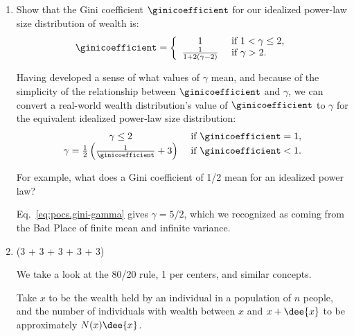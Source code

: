 \begin{enumerate}
  
   \solutionstart


   \solutionend


\item

  Show that the Gini coefficient $\ginicoefficient$
  for our idealized power-law size distribution of wealth is:
  \begin{equation}
    \ginicoefficient 
    =
    \left\{
    \begin{array}{cl}
      1
      &
      \ \textnormal{if} \
      1 < \gamma \le 2,
      \\
      \frac{1}{1 + 2(\gamma-2)}
      &
      \ \textnormal{if} \
      \gamma > 2.
    \end{array}
    \right.
    \label{eq:pocs.gini}
  \end{equation}

  Having developed a sense of what values of $\gamma$ mean,
  and because of the simplicity of the relationship between
  $\ginicoefficient$
  and
  $\gamma$,
  we can convert a real-world wealth distribution's
  value of $\ginicoefficient$
  to $\gamma$ for
  the equivalent
  idealized power-law size distribution:
  \begin{equation}
    \begin{array}{cl}
      \gamma
      \le
      2
      &
      \ \textnormal{if} \
      \ginicoefficient = 1,
      \\
      \gamma
      =
      \frac{1}{2}
      \left(
      \frac{1}{\ginicoefficient}
      +
      3
      \right)
      &
      \ \textnormal{if} \
      \ginicoefficient < 1.
    \end{array}
    \label{eq:pocs.gini-gamma}
  \end{equation}

  For example, what does a Gini coefficient of 1/2 mean for an idealized power law?

  Eq.~\ref{eq:pocs.gini-gamma} gives $\gamma = 5/2$,
  which we recognized as coming from the Bad Place of
  finite mean and infinite variance.
  
  
   \solutionstart


   \solutionend


\item (3 + 3 + 3 + 3 + 3)

  We take a look at the 80/20 rule, 1 per centers, and similar concepts.

  Take $x$ to be the  wealth held by an individual 
  in a population of $n$ people,
  and the number of individuals with wealth between $x$ and $x+\dee{x}$
  to be approximately $N(x) \dee{x}$.


\end{enumerate}
